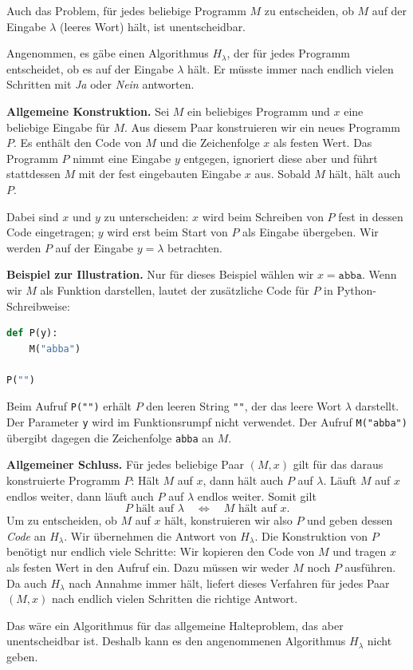 \begin{myremark}\label{myremark:H_lambda}
	Auch das Problem, für jedes beliebige Programm $M$ zu entscheiden, ob $M$ auf der Eingabe $\lambda$ (leeres Wort) hält, ist unentscheidbar.
	\begin{myproof}
		Angenommen, es gäbe einen Algorithmus $H_\lambda$, der für jedes Programm entscheidet, ob es auf der Eingabe $\lambda$ hält. Er müsste immer nach endlich vielen Schritten mit \emph{Ja} oder \emph{Nein} antworten.

		\textbf{Allgemeine Konstruktion.} Sei $M$ ein beliebiges Programm und $x$ eine beliebige Eingabe für $M$. Aus diesem Paar konstruieren wir ein neues Programm $P$. Es enthält den Code von $M$ und die Zeichenfolge $x$ als festen Wert. Das Programm $P$ nimmt eine Eingabe $y$ entgegen, ignoriert diese aber und führt stattdessen $M$ mit der fest eingebauten Eingabe $x$ aus. Sobald $M$ hält, hält auch $P$.

		Dabei sind $x$ und $y$ zu unterscheiden: $x$ wird beim Schreiben von $P$ fest in dessen Code eingetragen; $y$ wird erst beim Start von $P$ als Eingabe übergeben. Wir werden $P$ auf der Eingabe $y=\lambda$ betrachten.

		\textbf{Beispiel zur Illustration.} Nur für dieses Beispiel wählen wir $x=\texttt{abba}$. Wenn wir $M$ als Funktion darstellen, lautet der zusätzliche Code für $P$ in Python-Schreibweise:
\begin{lstlisting}[language=Python, numbers=none]
def P(y):
    M("abba")

P("")
\end{lstlisting}
		Beim Aufruf \texttt{P("")} erhält $P$ den leeren String \texttt{""}, der das leere Wort $\lambda$ darstellt. Der Parameter \texttt{y} wird im Funktionsrumpf nicht verwendet. Der Aufruf \texttt{M("abba")} übergibt dagegen die Zeichenfolge \texttt{abba} an $M$.

		\textbf{Allgemeiner Schluss.} Für jedes beliebige Paar $(M,x)$ gilt für das daraus konstruierte Programm $P$: Hält $M$ auf $x$, dann hält auch $P$ auf $\lambda$. Läuft $M$ auf $x$ endlos weiter, dann läuft auch $P$ auf $\lambda$ endlos weiter. Somit gilt
		\[
			P \text{ hält auf } \lambda
			\quad\Longleftrightarrow\quad
			M \text{ hält auf } x.
		\]
		Um zu entscheiden, ob $M$ auf $x$ hält, konstruieren wir also $P$ und geben dessen \emph{Code} an $H_\lambda$. Wir übernehmen die Antwort von $H_\lambda$. Die Konstruktion von $P$ benötigt nur endlich viele Schritte: Wir kopieren den Code von $M$ und tragen $x$ als festen Wert in den Aufruf ein. Dazu müssen wir weder $M$ noch $P$ ausführen. Da auch $H_\lambda$ nach Annahme immer hält, liefert dieses Verfahren für jedes Paar $(M,x)$ nach endlich vielen Schritten die richtige Antwort.

		Das wäre ein Algorithmus für das allgemeine Halteproblem, das aber unentscheidbar ist. Deshalb kann es den angenommenen Algorithmus $H_\lambda$ nicht geben.
	\end{myproof}
\end{myremark}

